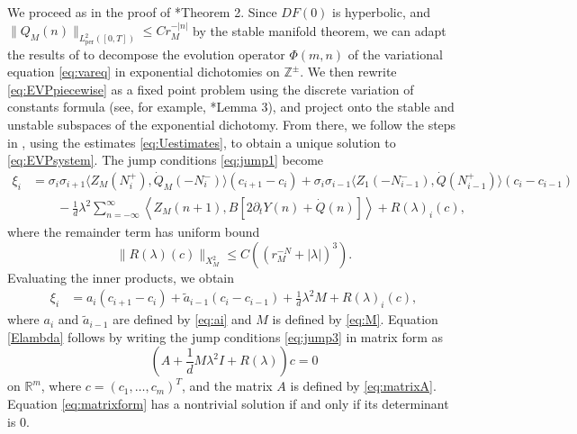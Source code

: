 \documentclass[12pt,reqno]{amsart}
\def\R{{\mathbb R}}
\def\Z{{\mathbb Z}}
\def\per{\textrm{per}}
\theoremstyle{definition}
\begin{document}
We proceed as in the proof of \cite{Parker2020}*{Theorem 2}. Since $DF(0)$ is hyperbolic, and $\| Q_M(n) \|_{L^2_\per([0,T])} \leq C r_M^{-|n|}$ by the stable manifold theorem, we can adapt the results of \cite{Palmer1988} to decompose the evolution operator $\Phi(m,n)$ of the variational equation \cref{eq:vareq} in exponential dichotomies on $\Z^\pm$. We then rewrite \cref{eq:EVPpiecewise} as a fixed point problem using the discrete variation of constants formula (see, for example, \cite{Parker2020}*{Lemma 3}), and project onto the stable and unstable subspaces of the exponential dichotomy. From there, we follow the steps in \cite{Parker2020}, using the estimates \cref{eq:Uestimates}, to obtain a unique solution to \cref{eq:EVPsystem}. The jump conditions \cref{eq:jump1} become
\begin{equation}\label{eq:jump2}
\begin{aligned}
\xi_i &= \sigma_i \sigma_{i+1} \langle Z_M(N_i^+), \dot{Q}_M (-N_i^-) \rangle (c_{i+1} - c_i) 
+ \sigma_i\sigma_{i-1} \langle  Z_1(-N_{i-1}^-), \dot{Q}(N_{i-1}^+) \rangle (c_i - c_{i-1}) \\
&\qquad -\frac{1}{d} \lambda^2 \sum_{n=-\infty}^\infty \left\langle Z_M(n+1), B[ 2 \partial_t Y(n) + \dot{Q}(n)]\right\rangle + R(\lambda)_i(c),
\end{aligned}
\end{equation}
where the remainder term has uniform bound
\[
\| R(\lambda)(c)\|_{X_M^2} \leq C \left( (r_M^{-N} + |\lambda|)^3\right).
\]
Evaluating the inner products, we obtain
\begin{equation}\label{eq:jump3}
\begin{aligned}
\xi_i &= a_i (c_{i+1} - c_i) + \tilde{a}_{i-1} (c_i - c_{i-1}) + \frac{1}{d} \lambda^2 M + R(\lambda)_i(c),
\end{aligned}
\end{equation}
where $a_i$ and $\tilde{a}_{i-1}$ are defined by \cref{eq:ai} and $M$ is defined by \cref{eq:M}. Equation \cref{Elambda} follows by writing the jump conditions \cref{eq:jump3} in matrix form as
\begin{equation}\label{eq:matrixform}
\left( A + \frac{1}{d} M \lambda^2 I + R(\lambda) \right) c = 0
\end{equation}
on $\R^m$, where $c = (c_1, \dots, c_m)^T$, and the matrix $A$ is defined by \cref{eq:matrixA}. Equation \cref{eq:matrixform} has a nontrivial solution if and only if its determinant is 0.



\end{document}
